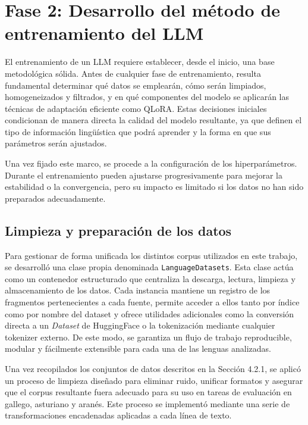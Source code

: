 \chapter{Fase 2: Desarrollo del método de entrenamiento del LLM}
\label{ch:analisis}


El entrenamiento de un LLM requiere establecer, desde el inicio, una base metodológica sólida. Antes de cualquier fase de entrenamiento, resulta fundamental determinar qué datos se emplearán, cómo serán limpiados, homogeneizados y filtrados, y en qué componentes del modelo se aplicarán las técnicas de adaptación eficiente como QLoRA. Estas decisiones iniciales condicionan de manera directa la calidad del modelo resultante, ya que definen el tipo de información lingüística que podrá aprender y la forma en que sus parámetros serán ajustados.

Una vez fijado este marco, se procede a la configuración de los hiperparámetros. Durante el entrenamiento pueden ajustarse progresivamente para mejorar la estabilidad o la convergencia, pero su impacto es limitado si los datos no han sido preparados adecuadamente. 


\section{Limpieza y preparación de los datos}
\label{sec:Limpieza}

Para gestionar de forma unificada los distintos corpus utilizados en este trabajo, se desarrolló una clase propia denominada \texttt{LanguageDatasets}. Esta clase actúa como un contenedor estructurado que centraliza la descarga, lectura, limpieza y almacenamiento de los datos. Cada instancia mantiene un registro de los fragmentos pertenecientes a cada fuente, permite acceder a ellos tanto por índice como por nombre del dataset y ofrece utilidades adicionales como la conversión directa a un \textit{Dataset} de HuggingFace o la tokenización mediante cualquier tokenizer externo. De este modo, se garantiza un flujo de trabajo reproducible, modular y fácilmente extensible para cada una de las lenguas analizadas.

Una vez recopilados los conjuntos de datos descritos en la Sección 4.2.1, se aplicó un proceso de limpieza diseñado para eliminar ruido, unificar formatos y asegurar que el corpus resultante fuera adecuado para su uso en tareas de evaluación en gallego, asturiano y aranés. Este proceso se implementó mediante una serie de transformaciones encadenadas aplicadas a cada línea de texto.

